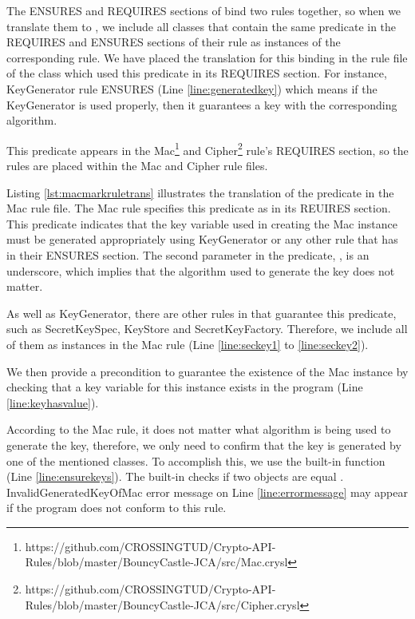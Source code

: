 The ENSURES and REQUIRES sections of \crysl{} bind two rules together, so when we translate them to \MARK, we include all classes that contain the same predicate in the REQUIRES and ENSURES sections of their \crysl{} rule as instances of the corresponding \MARK{} rule. We have placed the translation for this binding in the \MARK{} rule file of the class which used this predicate in its REQUIRES section. For instance, KeyGenerator \crysl{} rule ENSURES  (Line \ref{line:generatedkey}) which means if the KeyGenerator is used properly, then it guarantees a key with the corresponding algorithm.


This predicate appears in the Mac\footnote{https://github.com/CROSSINGTUD/Crypto-API-Rules/blob/master/BouncyCastle-JCA/src/Mac.crysl} and Cipher\footnote{https://github.com/CROSSINGTUD/Crypto-API-Rules/blob/master/BouncyCastle-JCA/src/Cipher.crysl} \crysl{} rule's REQUIRES section, so the \MARK{} rules are placed within the Mac and Cipher \MARK{} rule files.

Listing \ref{lst:macmarkruletrans} illustrates the translation of the  predicate in the Mac \MARK{} rule file. The Mac \crysl{} rule specifies this predicate as  in its REUIRES section. This predicate indicates that the key variable used in creating the Mac instance must be generated appropriately using KeyGenerator or any other rule that has  in their ENSURES section. The second parameter in the predicate, , is an underscore, which implies that the algorithm used to generate the key does not matter.


As well as KeyGenerator, there are other rules in \crysl{} that guarantee this predicate, such as SecretKeySpec, KeyStore and SecretKeyFactory. Therefore, we include all of them as instances in the Mac \MARK{} rule (Line \ref{line:seckey1} to \ref{line:seckey2}).
 
We then provide a precondition to guarantee the existence of the Mac instance by checking that a key variable for this instance exists in the program (Line \ref{line:keyhasvalue}). 

According to the Mac \crysl{} rule, it does not matter what algorithm is being used to generate the key, therefore, we only need to confirm that the key is generated by one of the mentioned classes. To accomplish this, we use the built-in function  (Line \ref{line:ensurekeys}). The built-in  checks if two objects are equal \cite{codyzegit}. InvalidGeneratedKeyOfMac error message on Line \ref{line:errormessage} may appear if the program does not conform to this rule. 
 
